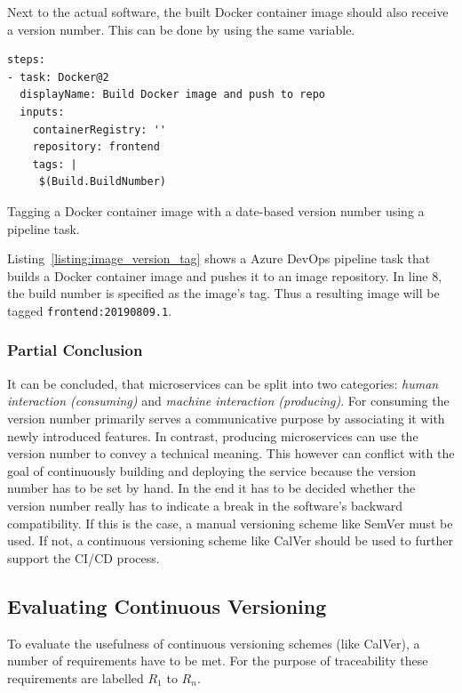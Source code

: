 Next to the actual software, the built Docker container image should also
receive a version number. This can be done by using the same variable.

\begin{listing}[H]
  \begin{verbatim}
steps:
- task: Docker@2
  displayName: Build Docker image and push to repo
  inputs:
    containerRegistry: ''
    repository: frontend
    tags: |
     $(Build.BuildNumber)
  \end{verbatim}
  \caption{Tagging a Docker container image with a date-based version number
  using a pipeline task.}%
  \label{listing:image_version_tag}
\end{listing}

Listing~\ref{listing:image_version_tag} shows a Azure DevOps pipeline task that
builds a Docker container image and pushes it to an image repository. In line
8, the build number is specified as the image's tag. Thus a resulting image
will be tagged \texttt{frontend:20190809.1}.

\subsubsection{Partial Conclusion}%
\label{ssub:Partial_Conclusion}
It can be concluded, that microservices can be split into two categories:
\textit{human interaction (consuming)} and \textit{machine interaction
(producing)}. For consuming the version number primarily serves a communicative
purpose by associating it with newly introduced features. In contrast,
producing microservices can use the version number to convey a technical
meaning. This however can conflict with the goal of continuously building and
deploying the service because the version number has to be set by hand. In the
end it has to be decided whether the version number really has to indicate a
break in the software's backward compatibility. If this is the case, a manual
versioning scheme like SemVer must be used. If not, a continuous versioning
scheme like CalVer should be used to further support the \ac{CI}/\ac{CD}
process.

\subsection{Evaluating Continuous Versioning}%
\label{sub:Evaluating_Continuous_Versioning}
To evaluate the usefulness of continuous versioning schemes (like CalVer), a
number of requirements have to be met. For the purpose of traceability these
requirements are labelled $R_1$ to $R_n$.

